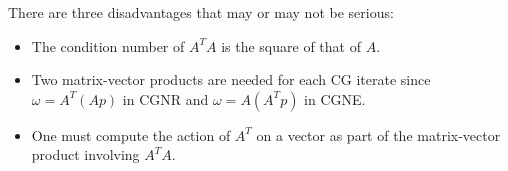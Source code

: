 \begin{rmk}
  There are three  disadvantages that may or may not be serious:
  \begin{itemize}
  \item The condition number of $A^TA$ is the square of that of $A$.
  \item Two matrix-vector products are needed for each CG iterate
    since $\omega=A^T(Ap)$ in CGNR and $\omega=A(A^Tp)$ in CGNE.
  \item One must compute the action of $A^T$ on a vector as part of
    the matrix-vector product involving $A^TA$.
  \end{itemize}
\end{rmk}

